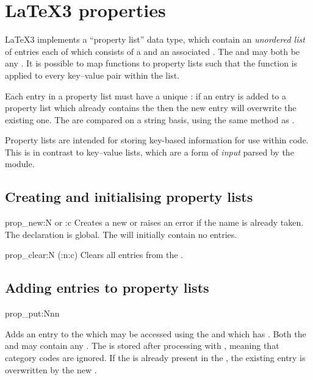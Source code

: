 \chapter{LaTeX3 properties}


 \LaTeX3 implements a \enquote{property list} data type, which contain
 an \emph{unordered list} of entries each of which consists of a  and
 an associated . The  and  may both be
 any . It is possible to map functions to property lists
 such that the function is applied to every key--value pair within
 the list.

 Each entry in a property list must have a unique : if an entry is
 added to a property list which already contains the  then the new
 entry will overwrite the existing one. The  are compared on a
 string basis, using the same method as .

 Property lists are intended for storing key-based information for use within
 code.  This is in contrast to key--value lists, which are a form of
 \emph{input} parsed by the  module.

 \section{Creating and initialising property lists}

 \begin{docCommand}{prop_new:N or :c}{}
   Creates a new  or raises an error if the name is
   already taken. The declaration is global. The  will
   initially contain no entries.
 \end{docCommand}

 \begin{docCommand}{prop_clear:N (:n:c) }{ }
   Clears all entries from the .
 \end{docCommand}

 \section{Adding entries to property lists}

 \begin{docCommand}{prop_put:Nnn}{   }
 
   Adds an entry to the  which may be accessed
   using the  and which has . Both the 
   and  may contain any . The 
   is stored after processing with , meaning that
   category codes are ignored. If the  is already present
   in the , the existing entry is overwritten
   by the new .
 \end{docCommand}
 
